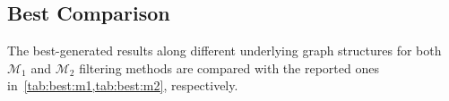 \documentclass[a4paper,10pt,conference,onecolumn]{IEEEtran}
\begin{document}
\begin{multicols}{2}
	\section{Best Comparison}
	The best-generated results along different underlying graph structures for both \(\mathcal{M}_1\) and \(\mathcal{M}_2\) filtering methods are compared with the reported ones in~\cref{tab:best:m1,tab:best:m2}, respectively.

	\begin{minipage}{0.47\linewidth}
		\begin{table}[H]
			\centering{}
			\caption{Best Comparison of \(\mathcal{M}_1\)}\label{tab:best:m1}
		\end{table}
	\end{minipage}
	\begin{minipage}{0.47\linewidth}
		\begin{table}[H]

\end{table}
\end{minipage}
\end{multicols}
\end{document}
